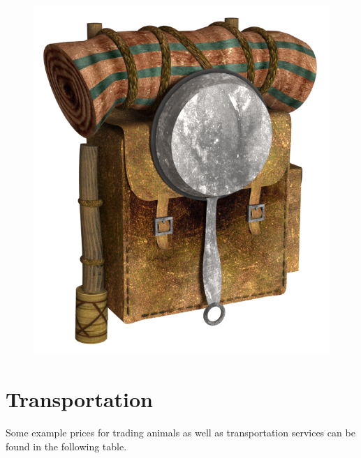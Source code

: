\begin{figure}[!h]
\begin{center}
\includegraphics[scale=0.2]{img/Backpack.png}
\end{center}
\end{figure}

\pagebreak

\section{Transportation}
Some example prices for trading animals as well as transportation services can be found in the following table.

